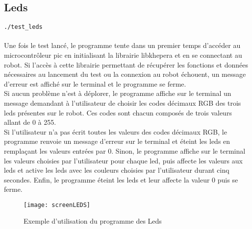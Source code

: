 \documentclass[11pt]{article} %
\begin{document}
\subsection{Leds}
\verb|./test_leds|\\ 
 \\
Une fois le test lancé, le programme tente dans un premier temps d’accéder au microcontrôleur pic en initialisant la librairie libkhepera et en se connectant au robot. Si l’accès à cette librairie permettant de récupérer les fonctions et données nécessaires au lancement du test ou la connexion au robot échouent, un message d’erreur est affiché sur le terminal et le programme se ferme.\\
Si aucun problème n’est à déplorer, le programme affiche sur le terminal un message demandant à l’utilisateur de choisir les codes décimaux RGB des trois leds présentes sur le robot. Ces codes sont chacun composés de trois valeurs allant de 0 à 255.\\
Si l’utilisateur n’a pas écrit toutes les valeurs des codes décimaux RGB, le programme renvoie un message d’erreur sur le terminal et éteint les leds en remplaçant les valeurs entrées par 0.
Sinon, le programme affiche sur le terminal les valeurs choisies par l’utilisateur pour chaque led, puis affecte les valeurs aux leds et active les leds avec les couleurs choisies par l’utilisateur durant cinq secondes. Enfin, le programme éteint les leds et leur affecte la valeur 0 puis se ferme.\\
\begin{figure}[H]
	\caption{Exemple d'utilisation du programme des Leds}
	\texttt{[image: screenLEDS]}
\end{figure}
\end{document}
